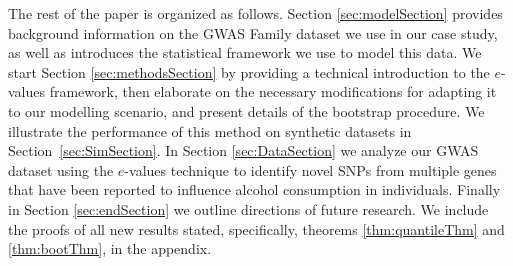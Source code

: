 The rest of the paper is organized as follows. Section \ref{sec:modelSection} provides background information on the GWAS Family dataset we use in our case study, as well as introduces the statistical framework we use to model this data. We start Section \ref{sec:methodsSection} by providing a technical introduction to the $e$-values framework, then elaborate on the necessary modifications for adapting it to our modelling scenario, and present details of the bootstrap procedure. We illustrate the performance of this method on synthetic datasets in Section~\ref{sec:SimSection}. In Section \ref{sec:DataSection} we analyze our GWAS dataset using the $e$-values technique to identify novel SNPs from multiple genes that have been reported to influence alcohol consumption in individuals. Finally in Section \ref{sec:endSection} we outline directions of future research. We include the proofs of all new results stated, specifically, theorems \ref{thm:quantileThm} and \ref{thm:bootThm}, in the appendix.